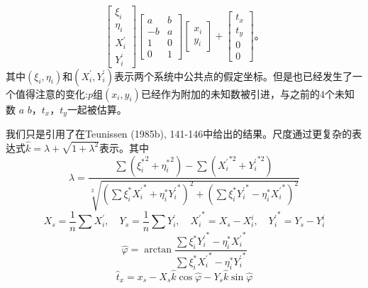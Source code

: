 \begin{equation}
	\begin{bmatrix}
		\xi_i\\
		\eta_i\\
		X_{i}^{'}\\
		Y_{i}^{'}
	\end{bmatrix}
	\begin{bmatrix}
		a  & b\\
		-b & a\\
		1 & 0\\
		0 & 1
	\end{bmatrix}
	\begin{bmatrix}
		x_i\\
		y_i
	\end{bmatrix}
	+
	\begin{bmatrix}
		t_x\\
		t_y\\
		0\\
		0
	\end{bmatrix}\text{。}
\end{equation}
其中$(\xi_i, \eta_i)$和$(X_{i}^{'},Y_{i}^{'})$表示两个系统中公共点的假定坐标。但是也已经发生了一个值得注意的变化:$p$组$(x_i, y_i)$已经作为附加的未知数被引进，与之前的4个未知数
$a$ $b$，$t_x$，$t_y$一起被估算。
\par
我们只是引用了在Teunissen (1985b), 141-146中给出的结果。尺度通过更复杂的表达式$\hat{k} = \lambda + \sqrt{1 + \lambda^2}$表示。其中
\begin{equation*}
	\lambda =  \frac{\sum({\xi_{i}^{\ast}}^2 + {\eta_{i}^{\ast}}^2) - \sum({X_{i}^{'}}^{\ast2} + {Y_{i}^{'}}^{\ast2})}
	{\sqrt[2]{(\sum\xi_{i}^{\ast}{X_{i}^{'}}^{\ast} + \eta_{i}^{\ast}{Y_{i}^{'}}^{\ast})^{2} + (\sum\xi_{i}^{\ast}{Y_{i}^{'}}^{\ast} - \eta_{i}^{\ast}{X_{i}^{'}}^{\ast})^{2}}}
\end{equation*}
\begin{equation*}
	X_s =  \frac{1}{n}\sum X_{i}^{'},\quad  Y_s = \frac{1}{n}\sum Y_{i}^{'},\quad {X_{i}^{'}}^{\ast} = X_s - X_{i}^{i},\quad  {Y_{i}^{'}}^{\ast} = Y_s - Y_{i}^{i}
\end{equation*}
\begin{equation}
	\hat{\varphi} = \arctan{\frac{\sum \xi_{i}^{\ast}{Y_{i}^{'}}^{\ast} - \eta_{i}^{\ast}{X_{i}^{'}}^{\ast}}{\sum \xi_{i}^{\ast}{X_{i}^{'}}^{\ast} - 
			\eta_{i}^{\ast}{Y_{i}^{'}}^{\ast}}}
\end{equation}
\begin{equation*}
	\hat{t}_x = x_s - X_s\hat{k}\cos{\hat{\varphi}} - Y_s\hat{k}\sin{\hat{\varphi}}
\end{equation*}
